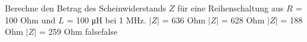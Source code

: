     {Berechne den Betrag des Scheinwiderstands $Z$ für eine Reihenschaltung aus $R$ = 100 Ohm und $L$ = 100 \si{\micro\henry} bei 1 MHz.}
    {$|Z|$ = 636 Ohm}
    {$|Z|$ = 628 Ohm}
    {$|Z|$ = 188 Ohm}
    {$|Z|$ = 259 Ohm}
    {false}{false}